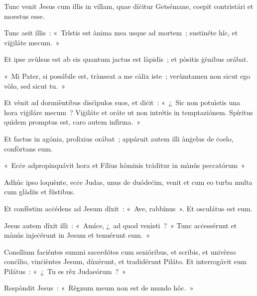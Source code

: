 \mysteryEnd
{}

Tunc venit Jesus cum illis in villam, quae díċitur Getsémane, coepit contristári et moestus esse. 

Tunc aeit illis~: «~Trîstis est ànima mea usque ad mortem~; sustinéte hîc, et viġiláte mecum.~» 

Et ipse avùlsus est ab eis quantum jactus est làpidis~; et pòsitis ġènibus orábat. 

«~Mi Pater, si possìbile est, trànseat a me càlix iste~; verùmtamen non sicut ego vòlo, sed sicut tu.~» 

Et vènit ad dormièntibus disċìpulos suos, et diċit~: «~¿~Sic non potuìstis una hora viġiláre mecum~? Viġiláte et oráte ut non intrétis in temptaziónem. Spíritus quìdem promptus est, caro autem infìrma.~» 

Et factus in agónia, prolìxius orábat~; appáruit autem illi ànġelus de ċoelo, confòrtans eum. 

«~Ecċe adpropinquávit hora et Fílius hòminis tráditur in mànůs peccatórum~» 

Adhůc ipso loquènte, ecċe Judas, unus de duódeċim, venit et cum eo turba multa cum glàdiis et fûstibus. 

Et confèstim acċédens ad Jesum dîxit~: «~Ave, rabbínus~». Et osculátus est eum. 

Jesus autem dîxit illi~: «~Amíce, ¿~ad quod venìsti~?~» Tunc acċessérunt et mànůs injeċérunt in Jesum et tenuérunt eum.~» 

\mysteryEnd
{}

Consílium faciéntes summi sacerdótes cum senióribus, et scribis, et univèrso conċìlio, vinċièntes Jesum, důxérunt, et tradidérunt Piláto. Et interrogávit eum Pilátus~: «~¿~Tu es rêx Judaeórum~?~» 

Respòndit Jesus~: «~Rêgnum meum non est de mundo hôc.~» 

